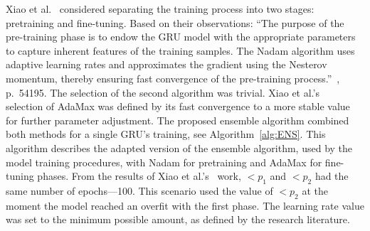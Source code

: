 %
%
Xiao et al.~\cite{xiao_accurate_2019} considered separating the training process into two stages: pretraining and fine-tuning.
Based on their observations: ``The purpose of the pre-training phase is to endow the GRU model with the appropriate parameters to capture inherent features of the training samples.
The Nadam algorithm uses adaptive learning rates and approximates the gradient using the Nesterov momentum, thereby ensuring fast convergence of the pre-training process.''~\cite{xiao_accurate_2019}, p.~54195.
The selection of the second algorithm was trivial.
Xiao et al.'s~\cite{xiao_accurate_2019} selection of AdaMax was defined by its fast convergence to a more stable value for further parameter adjustment.
The proposed ensemble algorithm combined both methods for a single GRU's training, see \mbox{Algorithm~\ref{alg:ENS}}.
This algorithm describes the adapted version of the ensemble algorithm, used by the model training procedures, with Nadam for pretraining and AdaMax for fine-tuning phases.
From the results of Xiao et al.'s~\cite{xiao_accurate_2019} work, $<p_{1}$ and $<p_{2}$ had the same number of epochs---100.
This scenario used the value of $<p_{2}$ at the moment the model reached an overfit with the first phase.
The learning rate value was set to the minimum possible amount, as defined by the research literature.

